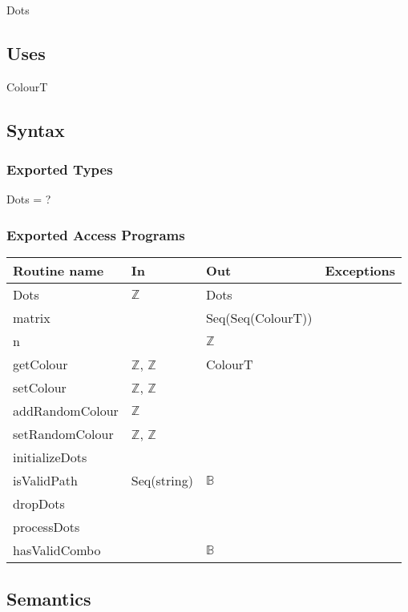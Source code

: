 \documentclass[12pt]{article}
\begin{document}
Dots

\subsection* {Uses}

ColourT

\subsection* {Syntax}

\subsubsection* {Exported Types}

Dots = ?

\subsubsection* {Exported Access Programs}

\begin{tabular}{| l | l | l | l |}
\hline
\textbf{Routine name} & \textbf{In} & \textbf{Out} & \textbf{Exceptions}\\
\hline
Dots & $\mathbb{Z}$ & Dots & ~\\
\hline
matrix & ~ & Seq(Seq(ColourT)) & ~\\
\hline
n & ~ & $\mathbb{Z}$ & ~\\
\hline
getColour & $\mathbb{Z}$, $\mathbb{Z}$ & ColourT & ~\\
\hline
setColour & $\mathbb{Z}$, $\mathbb{Z}$ & ~ & ~\\
\hline
addRandomColour & $\mathbb{Z}$ & ~ & ~\\
\hline
setRandomColour & $\mathbb{Z}$, $\mathbb{Z}$ & ~ & ~\\
\hline
initializeDots & ~ & ~ & ~\\
\hline
isValidPath & Seq(string) & $\mathbb{B}$ & ~\\
\hline
dropDots & ~ & ~ & ~\\
\hline
processDots & ~ & ~ & ~\\
\hline
hasValidCombo & ~ & $\mathbb{B}$ & ~\\
\hline
\end{tabular}

\subsection* {Semantics}
\end{document}
